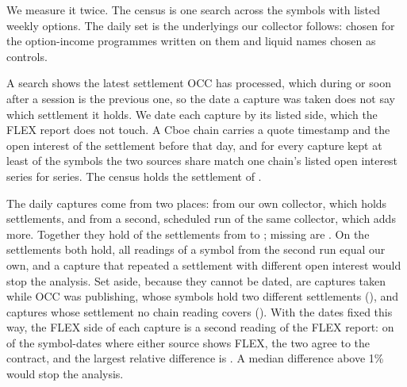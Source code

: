 \documentclass[11pt]{article}
\begin{document}
We measure it twice. The census is one search across the \HiddenCensusSymbols{} symbols
with listed weekly options. The daily set is the \HiddenDailyUniverse{} underlyings our
collector follows: \HiddenDailyProgramme{} chosen for the option-income programmes
written on them and \HiddenDailyControl{} liquid names chosen as controls.

A search shows the latest settlement OCC has processed, which during or soon after a
session is the previous one, so the date a capture was taken does not say which
settlement it holds. We date each capture by its listed side, which the FLEX report does
not touch. A Cboe chain carries a quote timestamp and the open interest of the
settlement before that day, and for every capture kept at least \HiddenDailySupportLow{}
of the \HiddenDailyCompared{} symbols the two sources share match one chain's listed open
interest series for series. The census holds the settlement of \HiddenCensusDate{}.

The daily captures come from two places: \HiddenDailyLocalCaptures{} from our own
collector, which holds \HiddenDailyLocalSettlements{} settlements, and
\HiddenDailyCICaptures{} from a second, scheduled run of the same collector, which adds
\HiddenDailyFromCI{} more. Together they hold \HiddenDailyDates{} of the
\HiddenDailySpan{} settlements from \HiddenDailyFirst{} to \HiddenDailyLast{}; missing
are \HiddenDailyMissingDates{}. On the \HiddenDailyBothRoots{} settlements both hold,
all \HiddenDailyCrossRoot{} readings of a symbol from the second run equal our own, and
a capture that repeated a settlement with different open interest would stop the
analysis. Set aside, because they cannot be dated, are captures taken while OCC was
publishing, whose symbols hold two different settlements (\HiddenDailyMixed{}), and
captures whose settlement no chain reading covers (\HiddenDailyUndated{}). With the dates fixed
this way, the FLEX side of each capture is a second reading of the FLEX report: on
\HiddenReconAgreeing{} of the \HiddenReconSymbolDates{} symbol-dates where either
source shows FLEX, the two agree to the contract, and the largest relative difference
is \HiddenReconMax{}. A median difference above 1\% would stop the analysis.
\end{document}
